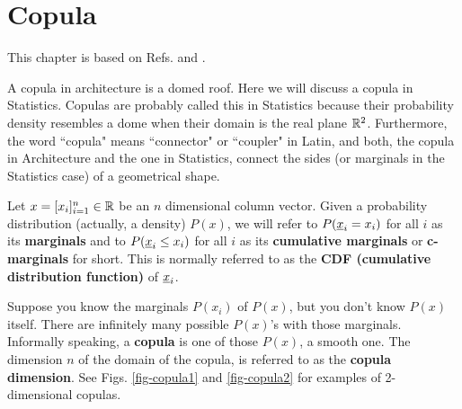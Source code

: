\chapter{Copula}
\label{ch-copula}

This chapter is based 
on Refs.\cite{wiki-copula}
and \cite{copula-bo}.

A copula in architecture is a domed roof. Here we will discuss a copula in Statistics.
Copulas are probably called this in Statistics
because their probability density resembles a dome when their domain is 
the real plane ${ \mathbb{R}}^2$.
Furthermore,
the word ``copula" means
``connector" or ``coupler" in Latin,
and both,
the copula in Architecture
and the one in Statistics,
connect the sides (or marginals in the
Statistics case) of a geometrical 
shape.

Let $x= [x_i]_{i=1}^n\in{ \mathbb{R}}$ be an $n$ 
dimensional column vector.
Given a probability
distribution (actually, a density) $P(x)$,
we will refer to $P({\underline{x}}_i=x_i)$ for all $i$
as its {\bf marginals}
and to $P({\underline{x}}_i\leq x_i)$ for all $i$
as its {\bf cumulative marginals} or {\bf c-marginals} for short.
This is normally referred
to as the {\bf CDF (cumulative
distribution function)} of ${\underline{x}}_i$.

Suppose you know the marginals $P(x_i)$ 
of  $P(x)$,
but you don't know $P(x)$
itself. There are
infinitely many
possible $P(x)$'s
with those marginals.
Informally
speaking,
a {\bf copula} is one of those
$P(x)$, a smooth one.
The dimension $n$ of
the domain of the copula,
is referred to as the
{\bf copula dimension}.
See Figs. \ref{fig-copula1}
and \ref{fig-copula2}
for examples of 2-dimensional copulas.

